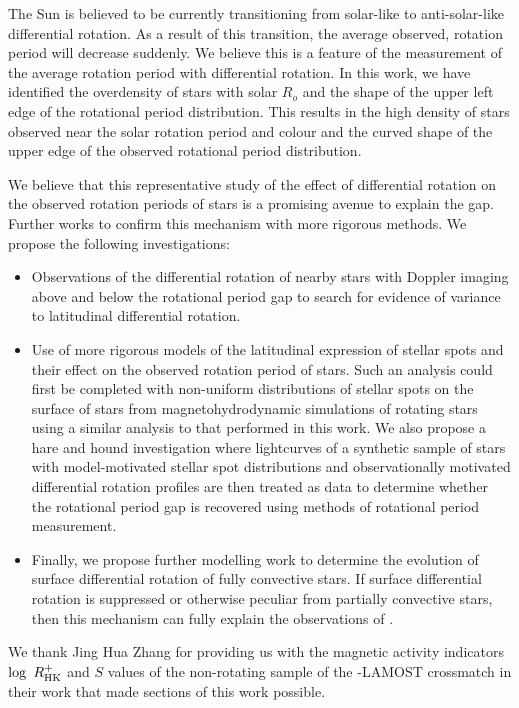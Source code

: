 The Sun is believed to be currently transitioning from solar-like to anti-solar-like differential rotation.
As a result of this transition, the average observed, rotation period will decrease suddenly.
We believe this is a feature of the measurement of the average rotation period with differential rotation.
In this work, we have identified the overdensity of stars with solar $R_o$ and the shape of the upper left edge of the rotational period distribution.
This results in the high density of stars observed near the solar rotation period and colour and the curved shape of the upper edge of the observed \citet{mcquillan_rotation_2014} rotational period distribution.
 
We believe that this representative study of the effect of differential rotation on the observed rotation periods of stars is a promising avenue to explain the gap.
Further works to confirm this mechanism with more rigorous methods.
We propose the following investigations:
\begin{itemize}
	\item Observations of the differential rotation of nearby stars with Doppler imaging above and below the rotational period gap to search for evidence of variance to latitudinal differential rotation.
	\item Use of more rigorous models of the latitudinal expression of stellar spots and their effect on the observed rotation period of stars. Such an analysis could first be completed with non-uniform distributions of stellar spots on the surface of stars from magnetohydrodynamic simulations of rotating stars using a similar analysis to that performed in this work. We also propose a hare and hound investigation where lightcurves of a synthetic sample of stars with model-motivated stellar spot distributions and observationally motivated differential rotation profiles are then treated as data to determine whether the rotational period gap is recovered using methods of rotational period measurement.
	\item Finally, we propose further modelling work to determine the evolution of surface differential rotation of fully convective stars. If surface differential rotation is suppressed or otherwise peculiar from partially convective stars, then this mechanism can fully explain the observations of \citet{lu_bridging_2022}.
\end{itemize}



We thank Jing Hua Zhang for providing us with the magnetic activity indicators $\log \ R^{+}_{\rm{HK}}$ and $S$ values of the non-rotating sample of the \kepler-LAMOST crossmatch in their work \citet{zhang_magnetic_2020} that made sections of this work possible.


